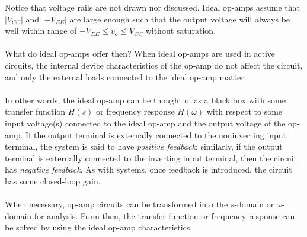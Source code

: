 \documentclass{report}
\begin{document}
Notice that voltage rails are not drawn nor discussed. Ideal op-amps assume that $|V_{CC}|$ and $|-V_{EE}|$ are large enough such that the output voltage will always be well within 
range of $-V_{EE} \leq v_o \leq V_{CC}$ without saturation.
\\ \\ 
What do ideal op-amps offer then? When ideal op-amps are used in active circuits, the internal device characteristics of the op-amp do not affect the circuit, and only the external loads 
connected to the ideal op-amp matter. 
\\ \\
In other words, the ideal op-amp can be thought of as a black box with some transfer function $H(s)$ or frequency response $H(\omega)$ with respect to some input voltage(s) 
connected to the ideal op-amp and the output voltage of the op-amp. If the output terminal is externally connected to the noninverting input terminal, the system is said to have \emph{positive feedback}; similarly, 
if the output terminal is externally connected to the inverting input terminal, then the circuit has \emph{negative feedback}. As with systems, once feedback is introduced, the circuit has some closed-loop gain.
\\ \\ 
When necessary, op-amp circuits can be transformed into the $s$-domain or $\omega$-domain for analysis. From then, the transfer function or frequency response can be solved by using the ideal op-amp characteristics.
\end{document}
